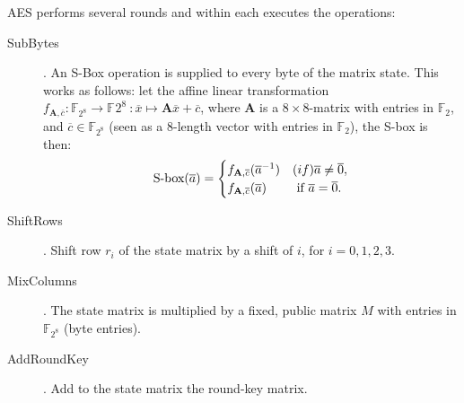 \documentclass[11pt]{article}
\begin{document}
AES performs several rounds and within each executes the operations:
\begin{description}
\item[SubBytes]. An S-Box operation is supplied to every byte of the matrix state. This works as follows: let the affine linear transformation $f_{\mathbf{A}, \overline{c}}: \mathbb{F}_{2^8} \to \mathbb{F}_{}2^8\ : \overline{x} \mapsto \mathbf{A} \overline{x} + \overline{c}$, where $\mathbf{A}$ is a $8\times8$-matrix with entries in $\mathbb{F}_2$, and $\overline{c} \in \mathbb{F}_{2^8}$ (seen as a $8$-length vector with entries in $\mathbb{F}_2$), the S-box is then:
\begin{equation*}
  \text{S-box}(\overline{a}) = 
  \begin{cases}
    f_{\mathbf{A}, \overline{c}}({\overline{a}}^{-1}) & \text( if ) \overline{a} \neq \overline{0}, \\
    f_{\mathbf{A},\overline{c}}(\overline{a}) & \text{ if } \overline{a} = \overline{0}.
  \end{cases}
\end{equation*}
\item[ShiftRows]. Shift row $r_i$ of the state matrix by a shift of $i$, for $i=0,1,2,3.$
\item[MixColumns]. The state matrix is multiplied by a fixed, public matrix $M$ with entries in $\mathbb{F}_{2^8}$ (byte entries).
\item[AddRoundKey]. Add to the state matrix the round-key matrix.

\end{description} 
\end{document}
